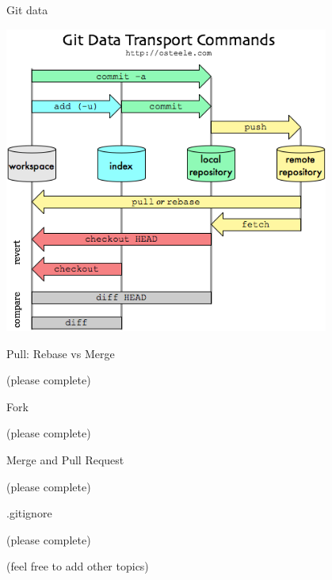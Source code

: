 \documentclass[hyperref,compress,handout,9pt,usepdftitle=false]{beamer}
\begin{document}
\begin{frame}{Git data}
\begin{center}
  \includegraphics[width=0.8\textwidth]{data_transport}
\end{center}
\end{frame}

\begin{frame}{Pull: Rebase vs Merge}
\begin{witemize}
\item (please complete)
\end{witemize}
\end{frame}

\begin{frame}{Fork}
\begin{witemize}
\item  (please complete)
\end{witemize}
\end{frame}

\begin{frame}{Merge and Pull Request}
\begin{witemize}
\item  (please complete)
\end{witemize}
\end{frame}

\begin{frame}{.gitignore}
\begin{witemize}
\item  (please complete)
\end{witemize}
\end{frame}

\begin{frame}{(feel free to add other topics)}
\begin{witemize}
\item  
\end{witemize}
\end{frame}
\end{document}
